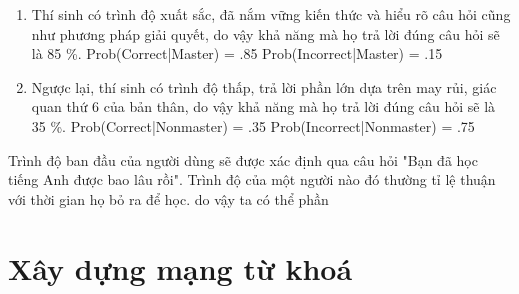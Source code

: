 \begin{enumerate}
	\item Thí sinh có trình độ xuất sắc, đã nắm vững kiến thức và hiểu rõ câu hỏi cũng như phương pháp giải quyết, do vậy khả năng mà họ trả lời đúng câu hỏi sẽ là 85 \%. 
		\subitem Prob(Correct|Master) = .85
		\subitem Prob(Incorrect|Master) = .15
	\item Ngược lại, thí sinh có trình độ thấp, trả lời phần lớn dựa trên may rủi, giác quan thứ 6 của bản thân, do vậy khả năng mà họ trả lời đúng câu hỏi sẽ là 35 \%. 
		\subitem Prob(Correct|Nonmaster) = .35
		\subitem Prob(Incorrect|Nonmaster) = .75
\end{enumerate}  


Trình độ ban đầu của người dùng sẽ được xác định qua câu hỏi "Bạn đã học tiếng Anh được bao lâu rồi". Trình độ của một người nào đó thường tỉ lệ thuận với thời gian họ bỏ ra để học.  do vậy ta có thể phần 


\section{Xây dựng mạng từ khoá}


